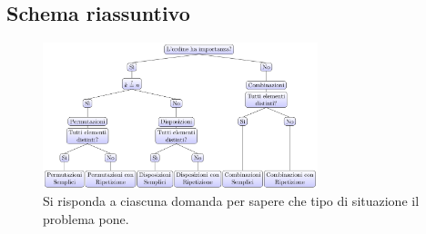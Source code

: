 \subsection{Schema riassuntivo}
\begin{figure}[h]
  \centering
  \includegraphics[width=8cm]{image/tree}
  \caption{Si risponda a ciascuna domanda per sapere che tipo di situazione il problema pone.}
\end{figure}
